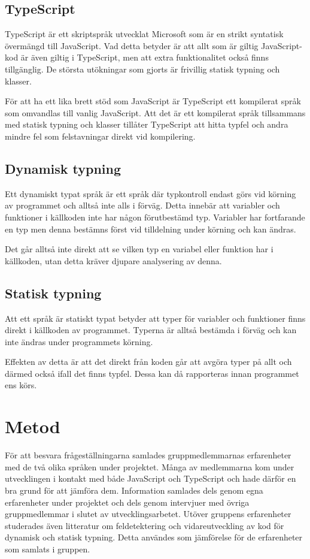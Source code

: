 \subsection{TypeScript}
TypeScript är ett skriptspråk utvecklat Microsoft som är en strikt syntatisk övermängd till JavaScript. Vad detta betyder är att allt som är giltig JavaScript-kod är även giltig i TypeScript, men att extra funktionalitet också finns tillgänglig. De största utökningar som gjorts är frivillig statisk typning och klasser.

För att ha ett lika brett stöd som JavaScript är TypeScript ett kompilerat språk som omvandlas till vanlig JavaScript. Att det är ett kompilerat språk tillsammans med statisk typning och klasser tillåter TypeScript att hitta typfel och andra mindre fel som felstavningar direkt vid kompilering.
\subsection{Dynamisk typning}
Ett dynamiskt typat språk är ett språk där typkontroll endast görs vid körning av programmet och alltså inte alls i förväg. Detta innebär att variabler och funktioner i källkoden inte har någon förutbestämd typ. Variabler har fortfarande en typ men denna bestämns först vid tilldelning under körning och kan ändras.

Det går alltså inte direkt att se vilken typ en variabel eller funktion har i källkoden, utan detta kräver djupare analysering av denna.
\subsection{Statisk typning}
Att ett språk är statiskt typat betyder att typer för variabler och funktioner finns direkt i källkoden av programmet. Typerna är alltså bestämda i förväg och kan inte ändras under programmets körning.

Effekten av detta är att det direkt från koden går att avgöra typer på allt och därmed också ifall det finns typfel. Dessa kan då rapporteras innan programmet ens körs.
\section{Metod}
För att besvara frågeställningarna samlades gruppmedlemmarnas erfarenheter med de två olika språken under projektet. Många av medlemmarna kom under utvecklingen i kontakt med både JavaScript och TypeScript och hade därför en bra grund för att jämföra dem. Information samlades dels genom egna erfarenheter under projektet och dels genom intervjuer med övriga gruppmedlemmar i slutet av utvecklingsarbetet. Utöver gruppens erfarenheter studerades även litteratur om feldetektering och vidareutveckling av kod för dynamisk och statisk typning. Detta användes som jämförelse för de erfarenheter som samlats i gruppen.

